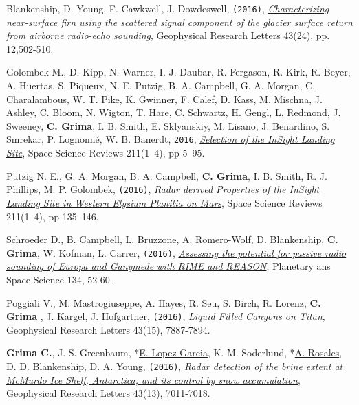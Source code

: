 \begin{etaremune}
  Blankenship, D. Young, F. Cawkwell, J. Dowdeswell, \texttt{(2016)},
  \href{http://onlinelibrary.wiley.com/doi/10.1002/2016GL071230/full}{\emph{Characterizing
  near-surface firn using the scattered signal component of the glacier
  surface return from airborne radio-echo sounding}}, Geophysical
  Research Letters 43(24), pp. 12,502-510.
\item
  Golombek M., D. Kipp, N. Warner, I. J. Daubar, R. Fergason, R. Kirk,
  R. Beyer, A. Huertas, S. Piqueux, N. E. Putzig, B. A. Campbell, G. A.
  Morgan, C. Charalambous, W. T. Pike, K. Gwinner, F. Calef, D. Kass, M.
  Mischna, J. Ashley, C. Bloom, N. Wigton, T. Hare, C. Schwartz, H.
  Gengl, L. Redmond, J. Sweeney, \textbf{C. Grima}, I. B. Smith, E.
  Sklyanskiy, M. Lisano, J. Benardino, S. Smrekar, P. Lognonné, W. B.
  Banerdt, \texttt{2016},
  \href{http://link.springer.com/article/10.1007/s11214-016-0321-9?wt_mc=Internal.Event.1.SEM.ArticleAuthorOnlineFirst}{\emph{Selection
  of the InSight Landing Site}}, Space Science Reviews 211(1–4), pp 5–95.
\item
  Putzig N. E., G. A. Morgan, B. A. Campbell, \textbf{C. Grima}, I. B.
  Smith, R. J. Phillips, M. P. Golombek, \texttt{(2016)},
  \href{http://link.springer.com/article/10.1007\%2Fs11214-016-0322-8}{\emph{Radar
  derived Properties of the InSight Landing Site in Western Elysium
  Planitia on Mars}}, Space Science Reviews 211(1–4), pp 135–146.
\item
  Schroeder D., B. Campbell, L. Bruzzone, A. Romero-Wolf, D.
  Blankenship, \textbf{C. Grima}, W. Kofman, L. Carrer, \texttt{(2016)},
  \href{http://www.sciencedirect.com/science/article/pii/S0032063316301465}{\emph{Assessing
  the potential for passive radio sounding of Europa and Ganymede with
  RIME and REASON}}, Planetary ans Space Science 134,  52-60.
\item
  Poggiali V., M. Mastrogiuseppe, A. Hayes, R. Seu, S. Birch, R. Lorenz,
  \textbf{C. Grima }, J. Kargel, J. Hofgartner, \texttt{(2016)},
  \href{http://onlinelibrary.wiley.com/doi/10.1002/2016GL069679/abstract}{\emph{Liquid
  Filled Canyons on Titan}}, Geophysical Research Letters 43(15), 7887-7894.
\item
  \textbf{Grima C.}, J. S. Greenbaum, *\underline{E. Lopez Garcia}, K.
  M. Soderlund, *\underline{A. Rosales}, D. D. Blankenship, D. A. Young,
  \texttt{(2016)},
  \href{http://onlinelibrary.wiley.com/doi/10.1002/2016GL069524/pdf}{\emph{Radar
  detection of the brine extent at McMurdo Ice Shelf, Antarctica, and
  its control by snow accumulation}}, Geophysical Research Letters 43(13), 7011-7018.

\end{etaremune}
